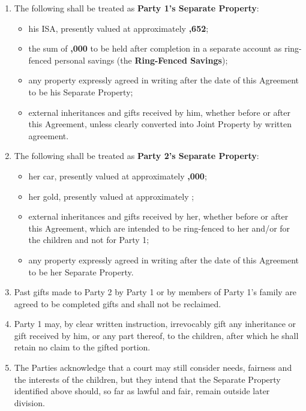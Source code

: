 \documentclass[10pt,a4paper]{article}
\begin{document}
\begin{enumerate}[label=\arabic*., start=17, leftmargin=1.8em]
    \item The following shall be treated as \textbf{Party 1's Separate Property}:
    \begin{itemize}[leftmargin=1.8em]
        \item his ISA, presently valued at approximately \textbf{,652};
        \item the sum of \textbf{,000} to be held after completion in a separate account as ring-fenced personal savings (the \textbf{Ring-Fenced Savings});
        \item any property expressly agreed in writing after the date of this Agreement to be his Separate Property;
        \item external inheritances and gifts received by him, whether before or after this Agreement, unless clearly converted into Joint Property by written agreement.
    \end{itemize}
    \item The following shall be treated as \textbf{Party 2's Separate Property}:
    \begin{itemize}[leftmargin=1.8em]
        \item her car, presently valued at approximately \textbf{,000};
        \item her gold, presently valued at approximately \textbf{};
        \item external inheritances and gifts received by her, whether before or after this Agreement, which are intended to be ring-fenced to her and/or for the children and not for Party 1;
        \item any property expressly agreed in writing after the date of this Agreement to be her Separate Property.
    \end{itemize}
    \item Past gifts made to Party 2 by Party 1 or by members of Party 1's family are agreed to be completed gifts and shall not be reclaimed.
    \item Party 1 may, by clear written instruction, irrevocably gift any inheritance or gift received by him, or any part thereof, to the children, after which he shall retain no claim to the gifted portion.
    \item The Parties acknowledge that a court may still consider needs, fairness and the interests of the children, but they intend that the Separate Property identified above should, so far as lawful and fair, remain outside later division.
\end{enumerate}
\end{document}
